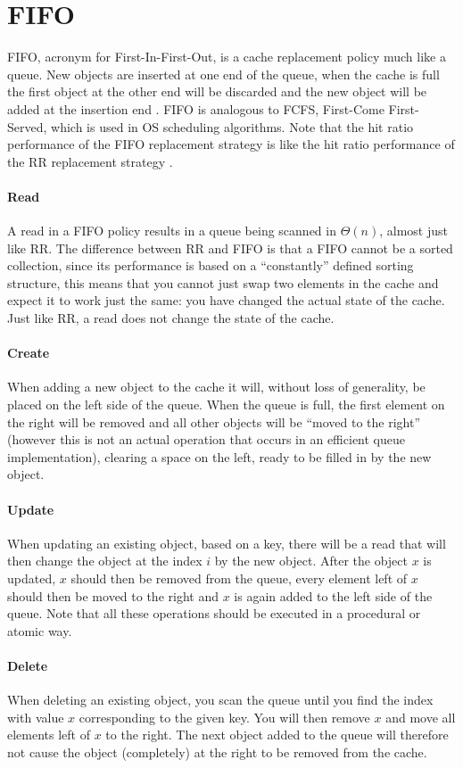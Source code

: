 \documentclass[pdftex,a4paper,12pt,twoside]{report}
\begin{document}
\section{FIFO}
FIFO, acronym for First-In-First-Out, is a cache replacement policy much like a queue. New objects are inserted at one end of the queue, when the cache is full the first object at the other end will be discarded and the new object will be added at the insertion end \citep{reineke2007timing}. FIFO is analogous to FCFS, First-Come First-Served, which is used in OS scheduling algorithms.
Note that the hit ratio performance of the FIFO replacement strategy is like the hit ratio performance of the RR replacement strategy \citep{rao1978performance}.
\paragraph{Read} A read in a FIFO policy results in a queue being scanned in $\Theta(n)$, almost just like RR. The difference between RR and FIFO is that a FIFO cannot be a sorted collection, since its performance is based on a ``constantly'' defined sorting structure, this means that you cannot just swap two elements in the cache and expect it to work just the same: you have changed the actual state of the cache. Just like RR, a read does not change the state of the cache.
\paragraph{Create} When adding a new object to the cache it will, without loss of generality, be placed on the left side of the queue. When the queue is full, the first element on the right will be removed and all other objects will be ``moved to the right'' (however this is not an actual operation that occurs in an efficient queue implementation), clearing a space on the left, ready to be filled in by the new object.
\paragraph{Update} When updating an existing object, based on a key, there will be a read that will then change the object at the index $i$ by the new object. After the object $x$ is updated, $x$ should then be removed from the queue, every element left of $x$ should then be moved to the right and $x$ is again added to the left side of the queue. Note that all these operations should be executed in a procedural or atomic way.
\paragraph{Delete} When deleting an existing object, you scan the queue until you find the index with value $x$ corresponding to the given key. You will then remove $x$ and move all elements left of $x$ to the right. The next object added to the queue will therefore not cause the object (completely) at the right to be removed from the cache.
\end{document}
